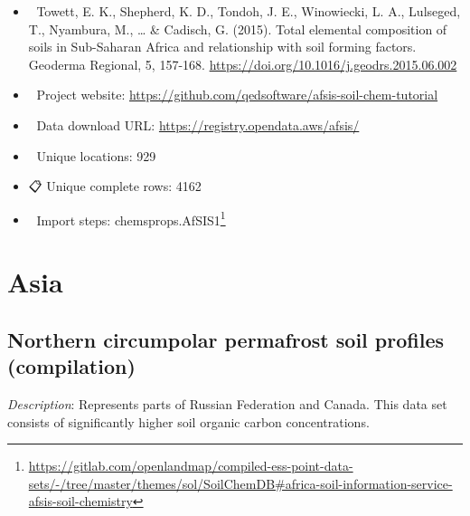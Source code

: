 \documentclass[
  graybox,natbib,nospthms]{svmono}
\providecommand{\tightlist}{%
  \setlength{\itemsep}{0pt}\setlength{\parskip}{0pt}}
\providecommand{\tightlist}{\setlength{\itemsep}{0pt}\setlength{\parskip}{0pt}}
\renewcommand{\href}[2]{#2 (\url{#1})}
\renewcommand{\href}[2]{#2\footnote{\url{#1}}}
\begin{document}
\begin{itemize}
\tightlist
\item
  📕 Towett, E. K., Shepherd, K. D., Tondoh, J. E., Winowiecki, L. A., Lulseged, T., Nyambura, M., \ldots{} \& Cadisch, G. (2015). Total elemental composition of soils in Sub-Saharan Africa and relationship with soil forming factors. Geoderma Regional, 5, 157-168. \url{https://doi.org/10.1016/j.geodrs.2015.06.002}\\
\item
  🔗 Project website: \url{https://github.com/qedsoftware/afsis-soil-chem-tutorial}\\
\item
  📂 Data download URL: \url{https://registry.opendata.aws/afsis/}\\
\item
  📍 Unique locations: 929\\
\item
  📋 Unique complete rows: 4162\\
\item
  📝 Import steps: \href{https://gitlab.com/openlandmap/compiled-ess-point-data-sets/-/tree/master/themes/sol/SoilChemDB\#africa-soil-information-service-afsis-soil-chemistry}{chemsprops.AfSIS1}
\end{itemize}

\hypertarget{asia}{%
\section{Asia}\label{asia}}

\hypertarget{northern-circumpolar-permafrost-soil-profiles-compilation}{%
\subsection{Northern circumpolar permafrost soil profiles (compilation)}\label{northern-circumpolar-permafrost-soil-profiles-compilation}}

\emph{Description}: Represents parts of Russian Federation and Canada.
This data set consists of significantly higher soil organic carbon concentrations.
\end{document}
